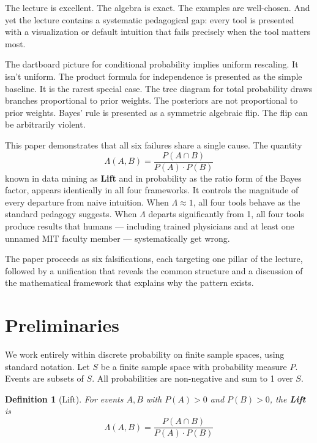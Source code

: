 \documentclass[12pt]{article}
\newtheorem{definition}[theorem]{Definition}
\begin{document}
The lecture is excellent. The algebra is exact. The examples are well-chosen. And yet the lecture contains a systematic pedagogical gap: every tool is presented with a visualization or default intuition that fails precisely when the tool matters most.

The dartboard picture for conditional probability implies uniform rescaling. It isn't uniform. The product formula for independence is presented as the simple baseline. It is the rarest special case. The tree diagram for total probability draws branches proportional to prior weights. The posteriors are not proportional to prior weights. Bayes' rule is presented as a symmetric algebraic flip. The flip can be arbitrarily violent.

This paper demonstrates that all six failures share a single cause. The quantity
\begin{equation}
\Lambda(A,B) = \frac{P(A \cap B)}{P(A) \cdot P(B)}
\end{equation}
known in data mining as \textbf{Lift} and in probability as the ratio form of the Bayes factor, appears identically in all four frameworks. It controls the magnitude of every departure from naive intuition. When $\Lambda \approx 1$, all four tools behave as the standard pedagogy suggests. When $\Lambda$ departs significantly from 1, all four tools produce results that humans --- including trained physicians and at least one unnamed MIT faculty member --- systematically get wrong.

The paper proceeds as six falsifications, each targeting one pillar of the lecture, followed by a unification that reveals the common structure and a discussion of the mathematical framework that explains why the pattern exists.

\section{Preliminaries}

We work entirely within discrete probability on finite sample spaces, using standard notation. Let $S$ be a finite sample space with probability measure $P$. Events are subsets of $S$. All probabilities are non-negative and sum to 1 over $S$.

\begin{definition}[Lift]
For events $A, B$ with $P(A) > 0$ and $P(B) > 0$, the \textbf{Lift} is
\begin{equation}
\Lambda(A,B) = \frac{P(A \cap B)}{P(A) \cdot P(B)}
\end{equation}
\end{definition}
\end{document}
